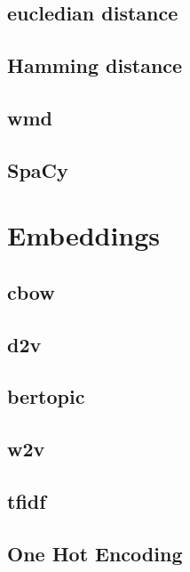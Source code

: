 \subsection{eucledian distance}\label{subsec:eucledian-distance}

\subsection{Hamming distance}\label{subsec:hamming-distance}

\subsection{\ac{wmd}}\label{subsec:word-mover-distance}

\subsection{SpaCy}\label{subsec:spacy}


\section{Embeddings}\label{sec:embeddings}

\subsection{\ac{cbow}}\label{subsec:bag-of-words}

\subsection{\ac{d2v}}\label{subsec:doc2vec}

\subsection{\ac{bertopic}}\label{subsec:bertopic}

\subsection{\ac{w2v}}\label{subsec:word2vec}

\subsection{\ac{tfidf}}\label{subsec:tfidf}

\subsection{One Hot Encoding}\label{subsec:one-hot-encoding}

